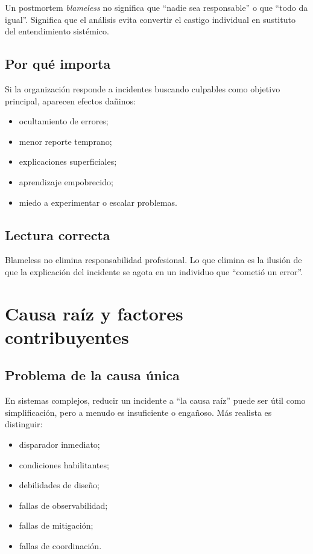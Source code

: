 \documentclass[variant=apuntes,cover=institutional,mode=screen]{ua-engineering-v6-article}
\begin{document}
Un postmortem \emph{blameless} no significa que “nadie sea responsable” o que “todo da igual”. Significa que el análisis evita convertir el castigo individual en sustituto del entendimiento sistémico.

\subsection{Por qué importa}

Si la organización responde a incidentes buscando culpables como objetivo principal, aparecen efectos dañinos:

\begin{itemize}
\item ocultamiento de errores;
\item menor reporte temprano;
\item explicaciones superficiales;
\item aprendizaje empobrecido;
\item miedo a experimentar o escalar problemas.
\end{itemize}

\subsection{Lectura correcta}

Blameless no elimina responsabilidad profesional. Lo que elimina es la ilusión de que la explicación del incidente se agota en un individuo que “cometió un error”.

\section{Causa raíz y factores contribuyentes}

\subsection{Problema de la causa única}

En sistemas complejos, reducir un incidente a “la causa raíz” puede ser útil como simplificación, pero a menudo es insuficiente o engañoso. Más realista es distinguir:

\begin{itemize}
\item disparador inmediato;
\item condiciones habilitantes;
\item debilidades de diseño;
\item fallas de observabilidad;
\item fallas de mitigación;
\item fallas de coordinación.
\end{itemize}
\end{document}
